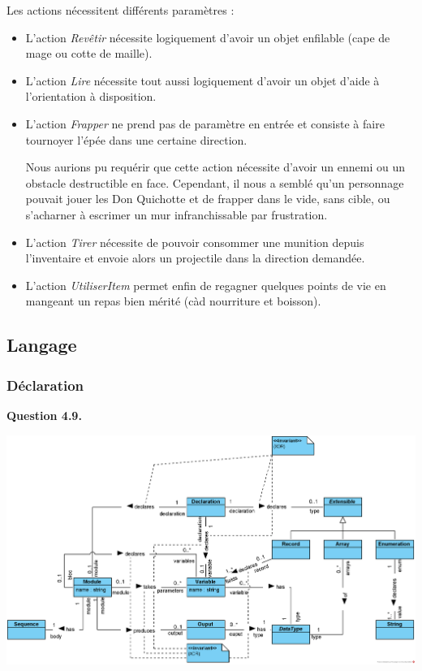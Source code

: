 \documentclass[oneside,a4paper]{book}
\begin{document}
\begin{samepage}
Les actions nécessitent différents paramètres :
\begin{itemize}
    \item L'action \textit{Revêtir} nécessite logiquement d'avoir un objet enfilable (cape de mage ou cotte de maille).
    \item L'action \textit{Lire} nécessite tout aussi logiquement d'avoir un objet d'aide à l'orientation à disposition.
    \item L'action \textit{Frapper} ne prend pas de paramètre en entrée et consiste à faire tournoyer l'épée dans une certaine direction.
        \begin{tcolorbox}
            Nous aurions pu requérir que cette action nécessite d'avoir un ennemi ou un obstacle destructible en face. Cependant, il nous a semblé qu'un personnage pouvait jouer les Don Quichotte et de frapper dans le vide, sans cible, ou s'acharner à escrimer un mur infranchissable par frustration. 
        \end{tcolorbox}
    \item L'action \textit{Tirer} nécessite de pouvoir consommer une munition depuis l'inventaire et envoie alors un projectile dans la direction demandée.
    \item L'action \textit{UtiliserItem} permet enfin de regagner quelques points de vie en mangeant un repas bien mérité (càd nourriture et boisson).
\end{itemize}
\end{samepage}

\subsection{Langage}

\subsubsection{Déclaration}
\textbf{Question 4.9.}\label{Question 4.9.}\newline

\nopagebreak 

\includegraphics[width=\textwidth,height=\textheight,keepaspectratio]{Diagrams/DS-Declaration.png}\newline
\end{document}
